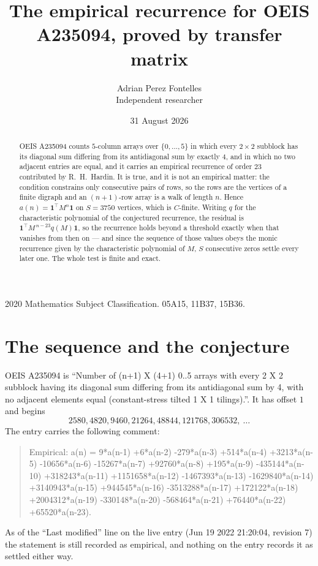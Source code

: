 \documentclass[11pt,a4paper]{article}
\title{The empirical recurrence for OEIS A235094, proved by transfer matrix}
\author{Adrian Perez Fontelles\\ \small Independent researcher}
\date{31 August 2026}
\theoremstyle{plain}
\theoremstyle{definition}
\begin{document}
\maketitle

\begin{abstract}
OEIS A235094 counts $5$-column arrays over $\{0,\dots,5\}$ in which every
$2\times2$ subblock has its diagonal sum differing from its antidiagonal sum by
exactly $4$, and in which no two adjacent entries are equal, and it
carries an empirical recurrence of order $23$ contributed by R.~H.~Hardin. It is true,
and it is not an empirical matter: the condition constrains only consecutive pairs of rows,
so the rows are the vertices of a finite digraph and an $(n+1)$-row array is a walk of
length $n$. Hence $a(n)=\mathbf{1}^{\!\top}M^{n}\mathbf{1}$ on $S=3750$ vertices, which
is $C$-finite. Writing $q$ for the characteristic polynomial of the conjectured recurrence,
the residual is $\mathbf{1}^{\!\top}M^{\,n-23}q(M)\mathbf{1}$, so the recurrence
holds beyond a threshold exactly when that vanishes from then on --- and since the sequence
of those values obeys the monic recurrence given by the characteristic polynomial of $M$,
$S$ consecutive zeros settle every later one. The whole test is finite and exact.
\end{abstract}

\noindent\small 2020 Mathematics Subject Classification. 05A15, 11B37, 15B36.\normalsize

\section{The sequence and the conjecture}

OEIS A235094 is ``Number of (n+1) X (4+1) 0..5 arrays with every 2 X 2 subblock having its diagonal sum differing from its antidiagonal sum by 4, with no adjacent elements equal (constant-stress tilted 1 X 1 tilings).''. It has offset
$1$ and begins
\[
2580, 4820, 9460, 21264, 48844, 121768, 306532,\ \dots
\]
The entry carries the following comment:
\begin{quote}\small
Empirical: a(n) = 9*a(n-1) +6*a(n-2) -279*a(n-3) +514*a(n-4) +3213*a(n-5) -10656*a(n-6) -15267*a(n-7) +92760*a(n-8) +195*a(n-9) -435144*a(n-10) +318243*a(n-11) +1151658*a(n-12) -1467393*a(n-13) -1629840*a(n-14) +3140943*a(n-15) +944545*a(n-16) -3513288*a(n-17) +172122*a(n-18) +2004312*a(n-19) -330148*a(n-20) -568464*a(n-21) +76440*a(n-22) +65520*a(n-23).
\end{quote}
As of the ``Last modified'' line on the live entry (Jun 19 2022 21:20:04, revision 7) the statement is
still recorded as empirical, and nothing on the entry records it as settled either way.
\end{document}

